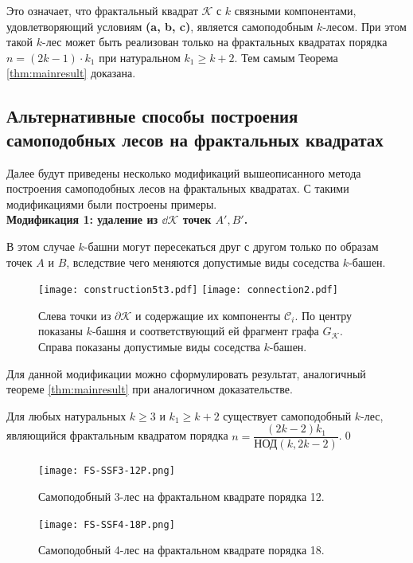 Это означает, что фрактальный квадрат $\mathcal{K}$ с $k$ связными компонентами, удовлетворяющий условиям \textbf{(a, b, c)}, является самоподобным $k$-лесом.
При этом такой $k$-лес может быть реализован только на фрактальных квадратах порядка $n=(2k-1)\cdot k_1$ при натуральном $k_1\geq k+2$.
Тем самым Теорема \ref{thm:mainresult} доказана.


\subsection{Альтернативные способы построения самоподобных лесов на фрактальных квадратах}

Далее будут приведены несколько модификаций вышеописанного метода построения самоподобных лесов на фрактальных квадратах.
С такими модификациями были построены примеры.\\

\textbf{Модификация 1: удаление из $\dd\mathcal{K}$ точек $A',B'$.}

В этом случае $k$-башни могут пересекаться друг с другом только по образам точек $A$ и $B$, вследствие чего меняются допустимые виды соседства $k$-башен.

\begin{figure}[H]
\texttt{[image: construction5t3.pdf]}
\hfill
\texttt{[image: connection2.pdf]}
\caption{Слева точки из $ \partial{\mathcal{K}}$ и содержащие их компоненты $\mathcal{C}_i$. По центру показаны $k$-башня и соответствующий ей фрагмент графа $G_{\mathcal{K}}$. Справа показаны допустимые виды соседства $k$-башен.}
\end{figure}

Для данной модификации можно сформулировать результат, аналогичный теореме \ref{thm:mainresult} при аналогичном доказательстве.

\begin{corollary}
Для любых натуральных $k\geq3$  и  $ k_1\ge k+2$ существует самоподобный $k$-лес, являющийся фрактальным квадратом порядка $n=\dfrac{(2k-2)k_1}{\text{НОД}(k,2k-2)}$.\qed
\end{corollary} 

\begin{figure}[H]
\hfill
\texttt{[image: FS-SSF3-12P.png]}
\caption{Самоподобный 3-лес на фрактальном квадрате порядка 12.}
\end{figure}


\begin{figure}[H]
\hfill
\texttt{[image: FS-SSF4-18P.png]}
\caption{Самоподобный 4-лес на фрактальном квадрате порядка 18.}
\end{figure}

